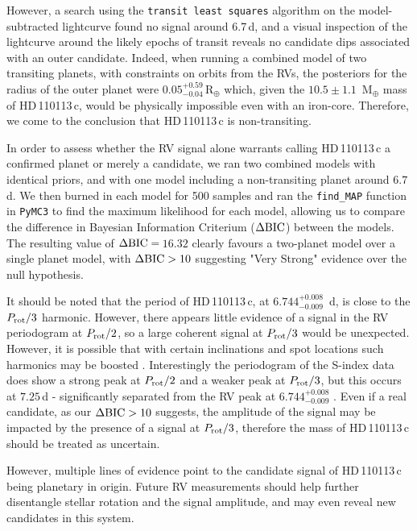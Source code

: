 \documentclass[fleqn,usenatbib]{mnras}
\newcommand{\rearth}{R$_{\oplus}$}
\newcommand{\mearth}{M$_{\oplus}$}
\newcommand{\TPone}{ $ 6.744^{+0.008}_{-0.009} $ }
\newcommand{\TMpone}{ $ 10.5 \pm 1.1 $ }
\newcommand{\Tplanetc}{HD\,110113\,c}
\newcommand{\TdeltaBIC}{$16.32$}
\begin{document}
However, a search using the \texttt{transit least squares} algorithm \citep{hippke2019optimized} on the model-subtracted lightcurve found no signal around 6.7\,d, and a visual inspection of the lightcurve around the likely epochs of transit reveals no candidate dips associated with an outer candidate.
Indeed, when running a combined model of two transiting planets, with constraints on orbits from the RVs, the posteriors for the radius of the outer planet were $0.05^{+0.59}_{−0.04}$\,\rearth{} which, given the \TMpone{}\,\mearth{} mass of \Tplanetc{}, would be physically impossible even with an iron-core.
Therefore, we come to the conclusion that \Tplanetc{} is non-transiting.

In order to assess whether the RV signal alone warrants calling \Tplanetc{} a confirmed planet or merely a candidate, we ran two combined models with identical priors, and with one model including a non-transiting planet around $6.7$d.
We then burned in each model for 500 samples and ran the \texttt{find\_MAP} function in \texttt{PyMC3} to find the maximum likelihood for each model, allowing us to compare the difference in Bayesian Information Criterium ($\Delta{\rm BIC}$) between the models.
The resulting value of $\Delta{\rm BIC}= $\,\TdeltaBIC{} clearly favours a two-planet model over a single planet model, with $\Delta{\rm BIC}>10$ suggesting "Very Strong" evidence over the null hypothesis. 

It should be noted that the period of \Tplanetc{}, at \TPone{}\,d, is close to the $P_{\rm rot}/3$ harmonic.
However, there appears little evidence of a signal in the RV periodogram at $P_{\rm rot}/2$, so a large coherent signal at $P_{\rm rot}/3$ would be unexpected.
However, it is possible that with certain inclinations and spot locations such harmonics may be boosted \citep{vanderburg2016radial,boisse2011disentangling}.
Interestingly the periodogram of the S-index data does show a strong peak at $P_{\rm rot}/2$ and a weaker peak at $P_{\rm rot}/3$, but this occurs at $7.25$\,d - significantly separated from the RV peak at \TPone{}.
Even if a real candidate, as our $\Delta{\rm BIC}>10$ suggests, the amplitude of the signal may be impacted by the presence of a signal at $P_{\rm rot}/3$, therefore the mass of \Tplanetc{} should be treated as uncertain. 

However, multiple lines of evidence point to the candidate signal of \Tplanetc{} being planetary in origin.
Future RV measurements should help further disentangle stellar rotation and the signal amplitude, and may even reveal new candidates in this system.
\end{document}
